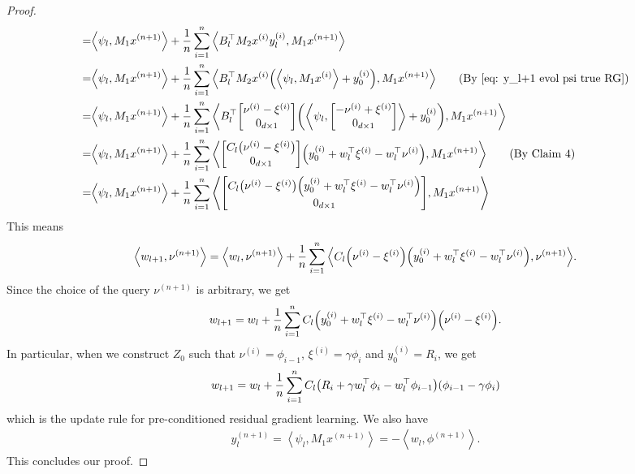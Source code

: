 \documentclass{article}
\newcommand{\explain}[1]{\tag*{(#1)}}
\newcommand{\indot}[2]{{\left<#1, #2\right>}}
\begin{document}
\begin{proof}
\begin{align}
        =&\indot{\psi_l}{M_1 x^{(n+1)}} + \frac{1}{n}\sum_{i=1}^n \indot{B_l^\top M_2 x^{(i)} y_l^{(i)}}{M_1 x^{(n+1)}}\\
        =&\indot{\psi_l}{M_1 x^{(n+1)}} +
        \frac{1}{n} \sum_{i=1}^n \indot{B_l^\top M_2 x^{(i)} \qty(\indot{\psi_l}{M_1 x^{(i)}} + y_0^{(i)})}{M_1 x^{(n+1)}} \explain{By \eqref{eq: y_l+1 evol psi true RG}}\\
        =&\indot{\psi_l}{M_1 x^{(n+1)}} +
        \frac{1}{n} \sum_{i=1}^n
        \indot{B_l^\top \mqty[\nu^{(i)} - \xi^{(i)} \\
                              0_{d\times 1}]
        \qty( \indot{\psi_l}{\mqty[-\nu^{(i)} + \xi^{(i)}\\ 0_{d\times 1}]} + y_0^{(i)})}{M_1 x^{(n+1)}}\\
        =&\indot{\psi_l}{M_1 x^{(n+1)}} +
        \frac{1}{n} \sum_{i=1}^n
        \indot{\mqty[C_l\qty(\nu^{(i)}- \xi^{(i)})\\
                     0_{d\times 1}]
        \qty( y_0^{(i)} +  w_l^\top \xi^{(i)} - w_l^\top \nu^{(i)} )}{M_1 x^{(n+1)}} \explain{By Claim 4}\\
        =&\indot{\psi_l}{M_1 x^{(n+1)}} +
        \frac{1}{n} \sum_{i=1}^n
        \indot{\mqty[C_l \qty(\nu^{(i)}-\xi^{(i)} ) \qty(y_0^{(i)} + w_l^\top \xi^{(i)} - w_l^\top \nu^{(i)})\\0_{d\times 1}]}
        {M_1 x^{(n+1)}}\\
    \end{align}
    This means
    \begin{align}
        \indot{w_{l+1}}{\nu^{(n+1)}}
        = \indot{w_l}{\nu^{(n+1)}}
        + \frac{1}{n} \sum_{i=1}^n
        \indot{C_l \qty(\nu^{(i)}-\xi^{(i)}) \qty(y_0^{(i)} + w_l^\top \xi^{(i)} - w_l^\top \nu^{(i)})}{
        \nu^{(n+1)}}.
    \end{align}
    Since the choice of the query $\nu^{(n+1)}$ is arbitrary, we get
    \begin{align}
        w_{l+1} = w_l + \frac{1}{n}\sum_{i=1}^n C_l \qty(y_0^{(i)} + w_l^\top \xi^{(i)} - w_l^\top \nu^{(i)}) \qty(\nu^{(i)}- \xi^{(i)}).
    \end{align}
    In particular, when we construct $Z_0$ such that $\nu^{(i)} = \phi_{i-1}$, $\xi^{(i)} = \gamma \phi_i$ and $y_0^{(i)} = R_i$,
    we get
    \begin{align}
        w_{l+1} = w_l + \frac{1}{n}\sum_{i=1}^n C_l \qty(R_i + \gamma w_l^\top \phi_i - w_l^\top \phi_{i-1})\qty(\phi_{i-1} -\gamma \phi_i)
    \end{align}
    which is the update rule for pre-conditioned residual gradient learning.
    We also have
    \begin{align}
        y_l^{(n+1)}
        = \indot{\psi_l}{M_1 x^{(n+1)}}
        = -\indot{w_l}{\phi^{(n+1)}}.
    \end{align}
    This concludes our proof.
\end{proof}
\end{document}
